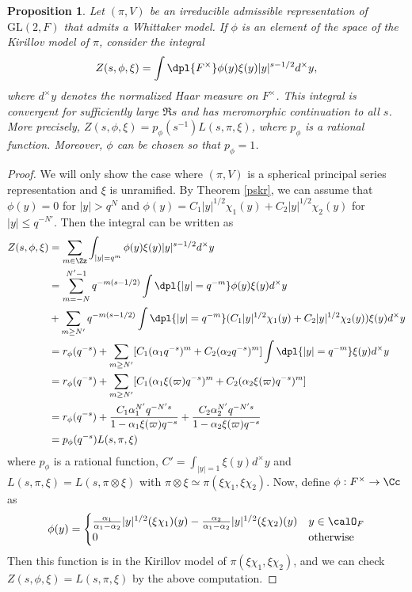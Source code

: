 \documentclass{article}
\newcommand{\GL}{\mathrm{GL}}
\newtheorem{proposition}{Proposition}[section]
\begin{document}
\begin{proposition}
Let $(\pi, V)$ be an irreducible admissible representation of $\GL(2, F)$ that admits a Whittaker model. 
If $\phi$ is an element of the space of the Kirillov model of $\pi$, consider the integral 
$$
Z(s, \phi, \xi) = \int\dpl{F^{\times}} \phi(y)\xi(y)|y|^{s-1/2} d^{\times}y, 
$$
where $d^{\times}y$ denotes the normalized Haar measure on $F^{\times}$. 
This integral is convergent for sufficiently large $\Re s$ and has meromorphic continuation to all $s$. 
More precisely, $Z(s, \phi, \xi) = p_{\phi}(s^{-1})L(s, \pi, \xi)$, where $p_{\phi}$ is a rational function. 
Moreover, $\phi$ can be chosen so that $p_{\phi} = 1$. 
\end{proposition}
\begin{proof}
We will only show the case where $(\pi, V)$ is a spherical principal series representation and $\xi$ is unramified. 
By Theorem \ref{pskr}, we can assume that $\phi(y) = 0$ for $|y| > q^N$ and  $\phi(y) = C_{1}|y|^{1/2}\chi_1(y) + C_{2}|y|^{1/2}\chi_2(y)$ for $|y|\leq q^{-N'}$. 
Then the integral can be written as
\begin{align*}
Z(s, \phi, \xi) &= \sum_{m\in \Zz} \int_{|y| = q^{m}} \phi(y)\xi(y) |y|^{s-1/2} d^{\times}y \\
&= \sum_{m=-N}^{N' - 1} q^{-m(s-1/2)} \int\dpl{|y| = q^{-m}} \phi(y)\xi(y)d^{\times}y \\
&+ \sum_{m\geq N'} q^{-m(s-1/2)}\int\dpl{|y| = q^{-m}} (C_{1}|y|^{1/2}\chi_1(y) + C_{2}|y|^{1/2} \chi_2(y)) \xi(y) d^{\times}y \\
&=r_{\phi}(q^{-s}) + \sum_{m\geq N'} [C_{1} (\alpha_1 q^{-s})^{m}  + C_{2}(\alpha_{2} q^{-s})^{m}]\int\dpl{|y| = q^{-m}}\xi(y)d^{\times}y \\
&= r_{\phi}(q^{-s}) + \sum_{m\geq N'} [C_{1} (\alpha_1 \xi(\varpi) q^{-s})^{m}  + C_{2}(\alpha_{2} \xi(\varpi)q^{-s})^{m}] \\
&= r_{\phi}(q^{-s}) + \frac{C_1 \alpha_{1}^{N'} q^{-N's}}{1-\alpha_{1}\xi(\varpi)q^{-s}} + \frac{C_2 \alpha_{2}^{N'} q^{-N's}}{1-\alpha_{2}\xi(\varpi)q^{-s}} \\
&=p_{\phi}(q^{-s}) L(s, \pi, \xi)
\end{align*}
where $p_{\phi}$ is a rational function, $C' = \int_{|y| = 1} \xi(y)d^{\times} y$ and $L(s, \pi, \xi) = L(s, \pi\otimes \xi)$ with $\pi\otimes \xi \simeq \pi(\xi \chi_1, \xi \chi_2)$. 
Now, define $\phi :F^{\times} \to \Cc$ as
$$
\phi(y) = \begin{cases} \frac{\alpha_{1}}{\alpha_{1} - \alpha_{2}} |y|^{1/2} (\xi\chi_{1})(y) - \frac{\alpha_{2}}{\alpha_{1} - \alpha_{2}} |y|^{1/2} (\xi\chi_{2})(y) & y\in \calO_F \\ 0 & \text{otherwise}\end{cases}
$$
Then this function is in the Kirillov model of $\pi(\xi \chi_1, \xi\chi_2)$, and we can check $Z(s, \phi, \xi) = L(s, \pi, \xi)$ by the above computation. 
\end{proof}
\end{document}
